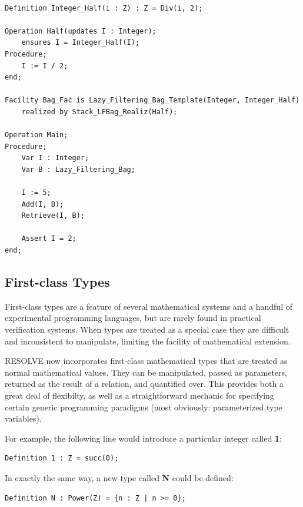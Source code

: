 \begin{lstlisting}

Definition Integer_Half(i : Z) : Z = Div(i, 2);

Operation Half(updates I : Integer);
	ensures I = Integer_Half(I); 
Procedure;
	I := I / 2;
end;

Facility Bag_Fac is Lazy_Filtering_Bag_Template(Integer, Integer_Half)
	realized by Stack_LFBag_Realiz(Half);

Operation Main;
Procedure;
	Var I : Integer;
	Var B : Lazy_Filtering_Bag;

	I := 5;
	Add(I, B);
	Retrieve(I, B);

	Assert I = 2;
end;
\end{lstlisting}

	\subsection{First-class Types\label{firstClassTypes}}

First-class types are a feature of several mathematical systems and a handful of experimental programming languages, but are rarely found in practical verification systems.  When types are treated as a special case they are difficult and inconsistent to manipulate, limiting the facility of mathematical extension.

RESOLVE now incorporates first-class mathematical types that are treated as normal mathematical values.  They can be manipulated, passed as parameters, returned as the result of a relation, and quantified over.  This provides both a great deal of flexibilty, as well as a straightforward mechanic for specifying certain generic programming paradigms (most obviously: parameterized type variables).

For example, the following line would introduce a particular integer called \textbf{1}:

\begin{lstlisting}
Definition 1 : Z = succ(0);
\end{lstlisting}

In exactly the same way, a new type called \textbf{N} could be defined:

\begin{lstlisting}
Definition N : Power(Z) = {n : Z | n >= 0};
\end{lstlisting}

